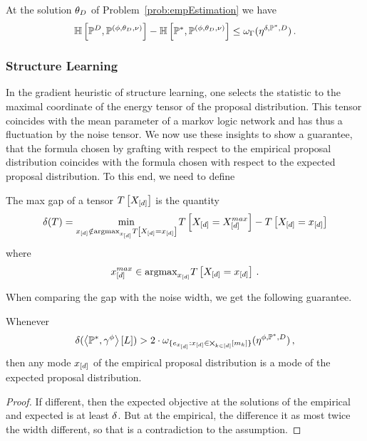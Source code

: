 \begin{corollary}
    At the solution $\theta_{D}$ of Problem~\ref{prob:empEstimation} we have
    \[ \mathbb{H}\left[\mathbb{P}^{D},\mathbb{P}^{(\phi,\theta_{D},\nu)}\right] - \mathbb{H}\left[\mathbb{P}^*,\mathbb{P}^{(\phi,\theta_{D},\nu)}\right]
    \leq  \omega_{\Gamma}(\eta^{\delta,\mathbb{P}^*,D}) \, . \]
\end{corollary}

\subsubsection{Structure Learning}

In the gradient heuristic of structure learning, one selects the statistic to the maximal coordinate of the energy tensor of the proposal distribution.
This tensor coincides with the mean parameter of a markov logic network and has thus a fluctuation by the noise tensor.
We now use these insights to show a guarantee, that the formula chosen by grafting with respect to the empirical proposal distribution coincides with the formula chosen with respect to the expected proposal distribution.
To this end, we need to define

\begin{definition}
    The max gap of a tensor $T\left[X_{[d]}\right]$ is the quantity
    \[ \delta(T)
    = \min_{x_{[d]} \notin \mathrm{argmax}_{x_{[d]}} T\left[X_{[d]}=x_{[d]}\right]} T\left[X_{[d]}
        = X_{[d]}^{max}\right] - T\left[X_{[d]}=x_{[d]}\right] \]
    where
    \[ x_{[d]}^{max} \in \mathrm{argmax}_{x_{[d]}} T\left[X_{[d]}=x_{[d]}\right] \, . \]
\end{definition}

When comparing the gap with the noise width, we get the following guarantee.

\begin{theorem}
    \label{the:detGuaranteeProposalDist}
    Whenever
    \begin{align*}
        \delta(\left\langle \mathbb{P}^*,\gamma^{\phi}\right\rangle \left[ L \right])
        > 2 \cdot  \omega_{\{e_{x_{[d]}} :x_{[d]}\in\bigtimes_{k\in[d]}[m_{k}]\}}(\eta^{\phi,\mathbb{P}^*,D}) \, ,
    \end{align*}
    then any mode $x_{[d]}$ of the empirical proposal distribution is a mode of the expected proposal distribution.
\end{theorem}
\begin{proof}
    If different, then the expected objective at the solutions of the empirical and expected is at least $\delta$.
    But at the empirical, the difference it as most twice the width different, so that is a contradiction to the assumption.
\end{proof}

